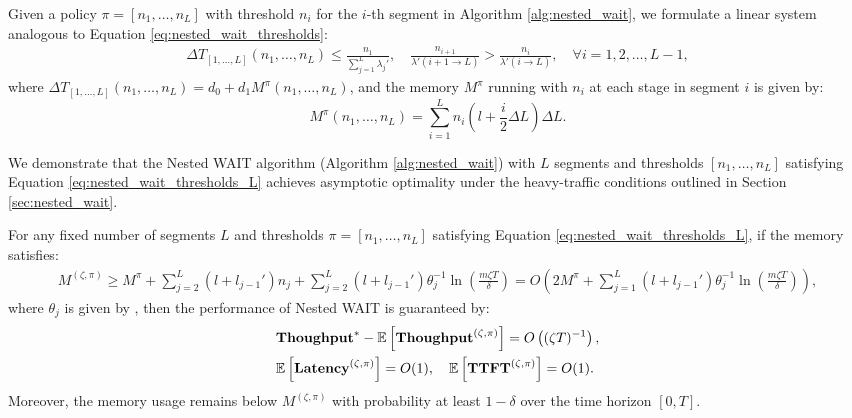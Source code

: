 Given a policy $\pi=[n_1,\dots,n_L]$ with threshold $n_i$ for the $i$-th segment in Algorithm \ref{alg:nested_wait}, we formulate a linear system analogous to Equation \eqref{eq:nested_wait_thresholds}:
\begin{align}
    \label{eq:nested_wait_thresholds_L}
    \Delta T_{[1,\dots,L]}(n_1,\dots,n_L) \leq \frac{n_1}{\sum_{j=1}^L \lambda_j'}, \quad 
    \frac{n_{i+1}}{\lambda'(i+1 \to L)} > \frac{n_i}{\lambda'(i \to L)}, \quad \forall i = 1, 2, \dots, L-1,
\end{align}
where $\Delta T_{[1,\dots,L]}(n_1,\dots,n_L) = d_0 + d_1 M^\pi(n_1, \dots, n_L)$, and the  memory $M^\pi$ running with $n_i$ at each stage in segment $i$ is given by:
\[
M^{\pi}(n_1, \dots, n_L) = \sum_{i=1}^L n_i \left( l + \frac{i}{2} \Delta L\right) \Delta L.
\]

We demonstrate that the Nested WAIT algorithm (Algorithm \ref{alg:nested_wait}) with $L$ segments and thresholds $[n_1, \dots, n_L]$ satisfying Equation \eqref{eq:nested_wait_thresholds_L} achieves asymptotic optimality under the heavy-traffic conditions outlined in Section \ref{sec:nested_wait}.

\begin{theorem}
\label{thm:nested_wait_heavy_traffic, any segment}
For any fixed number of segments $L$ and thresholds $\pi = [n_1, \dots, n_L]$ satisfying Equation \eqref{eq:nested_wait_thresholds_L}, if the memory satisfies:
\begin{align}
\label{eq:nested_wait_memory_L}
M^{(\zeta, \pi)} \geq M^\pi + \sum_{j=2}^L (l + l_{j-1}') n_j + \sum_{j=2}^L (l + l_{j-1}') \theta_j^{-1} \ln\left( \frac{m \zeta T}{\delta} \right) = O\left( 2M^\pi + \sum_{j=1}^L (l + l_{j-1}') \theta_j^{-1}\ln\left( \frac{m \zeta T}{\delta} \right) \right),
\end{align}
where $\theta_j$ is given by , then the performance of Nested WAIT is guaranteed by:
\begin{align*}
&\textbf{Thoughput}^* - \mathbb{E}\left[ \textbf{Thoughput}^{(\zeta, \pi)} \right] = O\left( (\zeta T)^{-1} \right), \\
&\mathbb{E}\left[ \textbf{Latency}^{(\zeta, \pi)} \right] = O(1), \quad \mathbb{E}\left[ \textbf{TTFT}^{(\zeta, \pi)} \right] = O(1).
\end{align*}
Moreover, the memory usage remains below $M^{(\zeta, \pi)}$ with probability at least $1 - \delta$ over the time horizon $[0, T]$.
\end{theorem}

